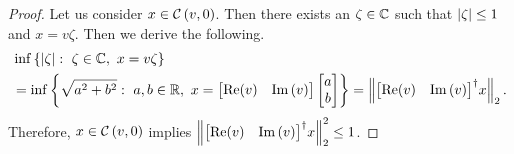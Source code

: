 %
\begin{proof}
Let us consider $x\in\cztope{v}{0}$.  Then there exists an
$\zeta\in\compnums$ such that $\absolute{\zeta}\leq 1$ and
$x=v\zeta$.  Then we derive the following.
%
\begin{align*}
& \min\set{\absolute{\zeta}:~\zeta\in\compnums,~x=v\zeta}\\
& =\min\set{\sqrt{a^2+b^2}:~a,b\in\reals,~x=\mymatrix{\real(v)
& \img\lt(v\rt)}\mymatrix{a\\b}}=\norm{\pinv{\mymatrix{\real(v)
& \img\lt(v\rt)}}x}.
\end{align*}
%
Therefore, $x\in\cztope{v}{0}$ implies $\norm{\pinv{\mymatrix{\real(v)
& \img\lt(v\rt)}}x}^2\leq 1$.
\end{proof}
%

  

